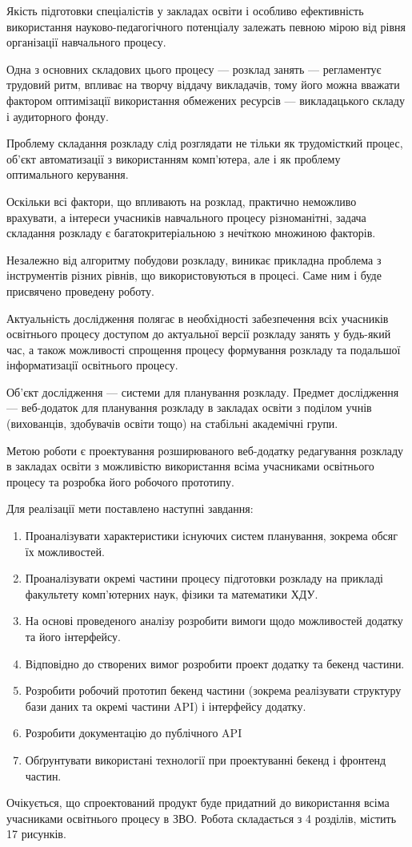 
Якість підготовки спеціалістів у закладах освіти і особливо ефективність використання науково-педагогічного потенціалу залежать певною мірою від рівня організації навчального процесу.

Одна з основних складових цього процесу — розклад занять — регламентує трудовий ритм, впливає на творчу віддачу викладачів, тому його можна вважати фактором оптимізації використання обмежених ресурсів — викладацького складу і аудиторного фонду.

Проблему складання розкладу слід розглядати не тільки як трудомісткий процес, об'єкт автоматизації з використанням комп’ютера, але і як проблему оптимального керування. 

Оскільки всі фактори, що впливають на розклад, практично неможливо врахувати, а інтереси учасників навчального процесу різноманітні, задача складання розкладу є багатокритеріальною з нечіткою множиною факторів.

Незалежно від алгоритму побудови розкладу, виникає прикладна проблема з інструментів різних рівнів, що використовуються в процесі. Саме ним і буде присвячено проведену роботу.

Актуальність дослідження полягає в необхідності забезпечення всіх учасників освітнього процесу доступом до актуальної версії розкладу занять у будь-який час, а також можливості спрощення процесу формування розкладу та подальшої інформатизації освітнього процесу.

Об’єкт дослідження — системи для планування розкладу. Предмет дослідження —  веб-додаток для планування розкладу в закладах освіти з поділом учнів (вихованців, здобувачів освіти тощо) на стабільні академічні групи.

Метою роботи є проектування розширюваного веб-додатку редагування розкладу в закладах освіти з можливістю використання всіма учасниками освітнього процесу та розробка його робочого прототипу.

Для реалізації мети поставлено наступні завдання:
\begin{enumerate}
	\item Проаналізувати характеристики існуючих систем планування, зокрема обсяг їх можливостей.
	\item Проаналізувати окремі частини процесу підготовки розкладу на прикладі факультету комп’ютерних наук, фізики та математики ХДУ.
	\item На основі проведеного аналізу розробити вимоги щодо можливостей додатку та його інтерфейсу.
	\item Відповідно до створених вимог розробити проект додатку та бекенд частини.
	\item Розробити робочий прототип бекенд частини (зокрема реалізувати структуру бази даних та окремі частини API) і інтерфейсу додатку.
	\item Розробити документацію до публічного API
	\item Обґрунтувати використані технології при проектуванні бекенд і фронтенд частин.
\end{enumerate}

Очікується, що спроектований продукт буде придатний до використання всіма учасниками освітнього процесу в ЗВО.
Робота складається з 4 розділів, містить 17 рисунків. 
